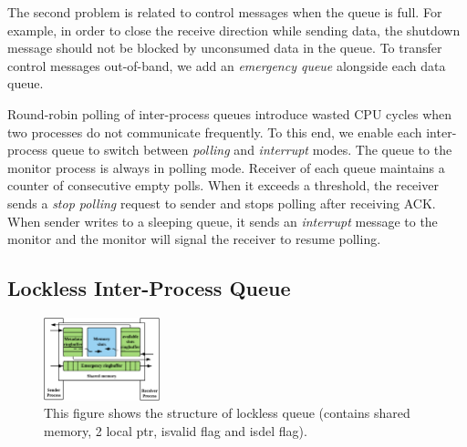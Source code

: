 The second problem is related to control messages when the queue is full. For example, in order to close the receive direction while sending data, the shutdown message should not be blocked by unconsumed data in the queue. To transfer control messages out-of-band, we add an \textit{emergency queue} alongside each data queue.

Round-robin polling of inter-process queues introduce wasted CPU cycles when two processes do not communicate frequently. To this end, we enable each inter-process queue to switch between \textit{polling} and \textit{interrupt} modes. The queue to the monitor process is always in polling mode. Receiver of each queue maintains a counter of consecutive empty polls. When it exceeds a threshold, the receiver sends a \textit{stop polling} request to sender and stops polling after receiving ACK. When sender writes to a sleeping queue, it sends an \textit{interrupt} message to the monitor and the monitor will signal the receiver to resume polling. 




\subsection{Lockless Inter-Process Queue}
\label{subsec:lockless-queue}

\begin{figure}[t]
	\centering
	\includegraphics[width=0.3\textwidth]{images/locklessq}
	\caption{This figure shows the structure of lockless queue (contains shared memory, 2 local ptr, isvalid flag and isdel flag).}
	\label{fig:locklessq-structure}
\end{figure}


